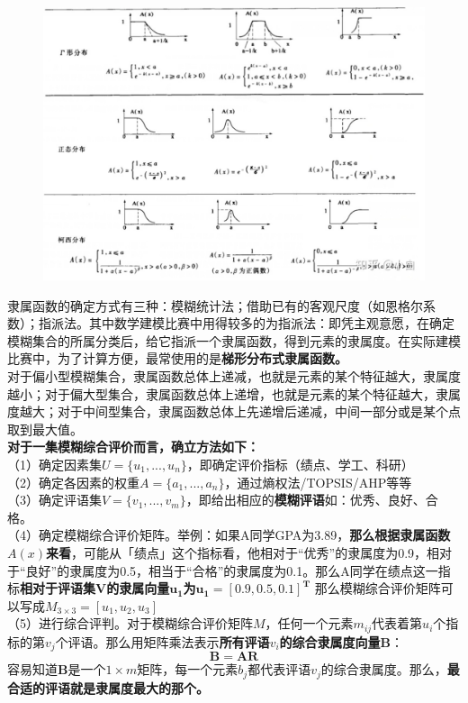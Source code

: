 \documentclass[11pt,a4paper]{article}
\begin{document}
\begin{figure}[h]
	\centering
	\includegraphics[scale=0.4]{Blurred Math2.jpg}
	\label{fig:label}
\end{figure}

隶属函数的确定方式有三种：模糊统计法；借助已有的客观尺度（如恩格尔系数）；指派法。其中数学建模比赛中用得较多的为指派法：即凭主观意愿，在确定模糊集合的所属分类后，给它指派一个隶属函数，得到元素的隶属度。在实际建模比赛中，为了计算方便，最常使用的是\textbf{梯形分布式隶属函数。}\\
\indent\setlength{\parindent}{2em}对于偏小型模糊集合，隶属函数总体上递减，也就是元素的某个特征越大，隶属度越小；对于偏大型集合，隶属函数总体上递增，也就是元素的某个特征越大，隶属度越大；对于中间型集合，隶属函数总体上先递增后递减，中间一部分或是某个点取到最大值。\\
\textbf{对于一集模糊综合评价而言，确立方法如下：}\\
（1）确定因素集$U=\{u_1,...,u_n\}$，即确定评价指标（绩点、学工、科研）\\
（2）确定各因素的权重$A=\{a_1,...,a_n\}$，通过熵权法/TOPSIS/AHP等等\\
（3）确定评语集$V=\{v_1,...,v_m\}$，即给出相应的\textbf{模糊评语}如：优秀、良好、合格。\\
（4）确定模糊综合评价矩阵。举例：如果A同学GPA为3.89，\textbf{那么根据隶属函数$A(x)$来看}，可能从「绩点」这个指标看，他相对于“优秀”的隶属度为0.9，相对于“良好”的隶属度为0.5，相当于“合格”的隶属度为0.1。那么A同学在绩点这一指标\textbf{相对于评语集$\boldsymbol{V}$的隶属向量$\boldsymbol{u_1}$为$\boldsymbol{u_1=[0.9,0.5,0.1]^T}$}
那么模糊综合评价矩阵可以写成$M_{3\times3}=[u_1,u_2,u_3]$\\
（5）进行综合评判。对于模糊综合评价矩阵$M$，任何一个元素$m_{ij}$代表着第$u_i$个指标的第$v_j$个评语。那么用矩阵乘法表示\textbf{所有评语$v_i$的综合隶属度向量B}：
\begin{equation*}
	\boldsymbol{B=AR}
\end{equation*}
容易知道$\boldsymbol{B}$是一个$1\times m$矩阵，每一个元素$b_j$都代表评语$v_j$的综合隶属度。那么，\textbf{最合适的评语就是隶属度最大的那个。}\\
\end{document}
